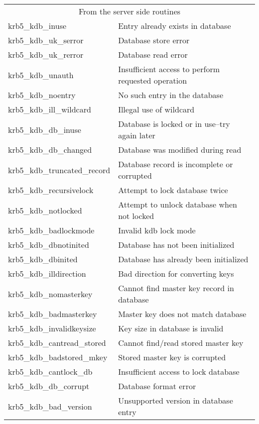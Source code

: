 \begin{small}
\begin{tabular}{ll}
\multicolumn{2}{c}{From the server side routines} \\
{\sc krb5_kdb_inuse }&	Entry already exists in database\\
{\sc krb5_kdb_uk_serror }&	Database store error\\
{\sc krb5_kdb_uk_rerror }&	Database read error\\
{\sc krb5_kdb_unauth }&	Insufficient access to perform requested operation\\
{\sc krb5_kdb_noentry }&	No such entry in the database\\
{\sc krb5_kdb_ill_wildcard }& Illegal use of wildcard\\
{\sc krb5_kdb_db_inuse }&	Database is locked or in use--try again later\\
{\sc krb5_kdb_db_changed }&	Database was modified during read\\
{\sc krb5_kdb_truncated_record }&	Database record is incomplete or corrupted\\
{\sc krb5_kdb_recursivelock }&	Attempt to lock database twice\\
{\sc krb5_kdb_notlocked }&		Attempt to unlock database when not locked\\
{\sc krb5_kdb_badlockmode }&	Invalid kdb lock mode\\
{\sc krb5_kdb_dbnotinited }&	Database has not been initialized\\
{\sc krb5_kdb_dbinited }&		Database has already been initialized\\
{\sc krb5_kdb_illdirection }&	Bad direction for converting keys\\
{\sc krb5_kdb_nomasterkey }&	Cannot find master key record in database\\
{\sc krb5_kdb_badmasterkey }&	Master key does not match database\\
{\sc krb5_kdb_invalidkeysize }&	Key size in database is invalid\\
{\sc krb5_kdb_cantread_stored }&	Cannot find/read stored master key\\
{\sc krb5_kdb_badstored_mkey }&	Stored master key is corrupted\\
{\sc krb5_kdb_cantlock_db }&	Insufficient access to lock database \\
{\sc krb5_kdb_db_corrupt }&		Database format error\\
{\sc krb5_kdb_bad_version }&	Unsupported version in database entry \\
\end{tabular}
\end{small}

